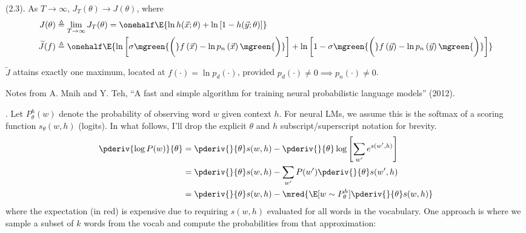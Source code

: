 \documentclass[11pt]{article}
\begin{document}
\myspace
\p {} (2.3). As $T \rightarrow \infty$, $J_T(\theta) \rightarrow J(\theta)$, where
\begin{align}
J(\theta) 
&\triangleq \lim_{T \rightarrow \infty} J_T(\theta)
= \onehalf \E{\ln h(\vec x; \theta)     +    \ln\left[1 -  h(\vec y; \theta) \right]  } \\
\widetilde{J}(f)
&\triangleq \onehalf \E{ 
	\ln\left[   \sigma \mgreen{ \bigg( }  f\left(\vec x\right) - \ln p_n\left( \vec x \right)  \mgreen{ \bigg) }   \right] 
	+ \ln\left[  1 -  \sigma \mgreen{ \bigg( }  f\left(\vec y\right) - \ln p_n\left( \vec y \right)   \mgreen{ \bigg) }  \right]    }
\end{align}
\begin{definition}[-1em][Theorem 1]
	$\widetilde J$ attains exactly one maximum, located at $f(\cdot) = \ln p_d(\cdot)$, provided $p_d(\cdot){\ne}0 \implies p_n(\cdot){\ne}0$. 
\end{definition}





Notes from A. Mnih and Y. Teh, ``A fast and simple algorithm for training neural probabilistic language models'' (2012). 

. Let $P_{\theta}^h(w)$ denote the probability of observing word $w$ given context $h$. For neural LMs, we assume this is the softmax of a scoring function $s_{\theta}(w, h)$ (logits). In what follows, I'll drop the explicit $\theta$ and $h$ subscript/superscript notation for brevity.
\begin{align}
\pderiv{\log P(w)}{\theta}
&= \pderiv{}{\theta} s(w, h) - \pderiv{}{\theta} \log \left[ \sum_{w'} e^{s(w', h)} \right] \\
&= \pderiv{}{\theta} s(w, h) - \sum_{w'} P(w') \pderiv{}{\theta} s(w', h) \\
&=  \pderiv{}{\theta} s(w, h) - \mred{ \E[w \sim P_{\theta}^{h}]{\pderiv{}{\theta} s(w, h)} }
\end{align}
where the expectation (in red) is expensive due to requiring $s(w, h)$ evaluated for all words in the vocabulary. One approach is  where we sample a subset of $k$ words from the vocab and compute the probabilities from that approximation:
\end{document}
